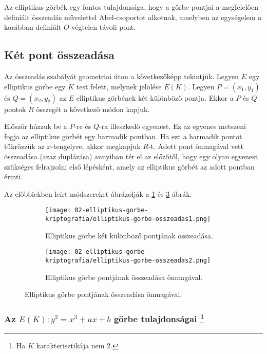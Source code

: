 Az elliptikus görbék egy fontos tulajdonsága, hogy a görbe pontjai a megfelelően definiált összeadás művelettel Abel-csoportot alkotnak, amelyben az egységelem a korábban definiált $O$ végtelen távoli pont.

\subsection{Két pont összeadása}

Az összeadás szabályát geometriai úton a következőképp tekintjük. Legyen $E$ egy elliptikus görbe egy $K$ test felett, melynek jelölése $E(K)$. Legyen $P = (x_1, y_1)$ és $Q = (x_2, y_2)$ az $E$ elliptikus görbének két különböző pontja. Ekkor a $P$ és $Q$ pontok $R$ összegét a következő módon kapjuk.

Először húzzuk be a $P$-re és $Q$-ra illeszkedő egyenest. Ez az egyenes metszeni fogja az elliptikus görbét egy harmadik pontban. Ha ezt a harmadik pontot tükrözzük az $x$-tengelyre, akkor megkapjuk $R$-t. Adott pont önmagával vett összeadása (azaz duplázása) annyiban tér el az előzőtől, hogy egy olyan egyenest szükséges felrajzolni első lépésként, amely az elliptikus görbét az adott pontban érinti.

Az előbbiekben leírt módszereket ábrázolják a \ref{Figure::ECC::EllipticCurveAddition1} és \ref{Figure::ECC::EllipticCurveAddition2} ábrák.

\begin{figure}[H]{}
    \centering
    \begin{subfigure}[t]{0.48\textwidth}
        \centering
        \captionsetup{width=.86\linewidth}
        \texttt{[image: 02-elliptikus-gorbe-kriptografia/elliptikus-gorbe-osszeadas1.png]}
        \caption{Elliptikus görbe két különböző pontjának összeadása.}
        \label{Figure::ECC::EllipticCurveAddition1}
    \end{subfigure}
    \begin{subfigure}[t]{0.48\textwidth}
        \centering
        \captionsetup{width=.86\linewidth}
        \texttt{[image: 02-elliptikus-gorbe-kriptografia/elliptikus-gorbe-osszeadas2.png]}
        \caption{Elliptikus görbe pontjának összeadása önmagával.}
        \label{Figure::ECC::EllipticCurveAddition2}
    \end{subfigure}
\end{figure}


\subsubsection{Az $E(K) : y^2 = x^3 + ax + b$ görbe tulajdonságai \protect\footnote{Ha $K$ karakterisztikája nem $2$.}}

